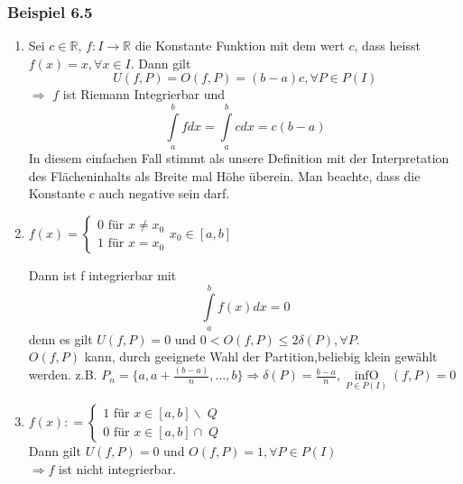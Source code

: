 \subsubsection*{Beispiel 6.5}
\begin{enumerate}[\indent 1)]
\item Sei $c\in \mathbb{R}$, $f:I\rightarrow \mathbb{R}$ die Konstante Funktion mit dem wert $c$, dass heisst $f(x)=x, \forall x\in I$. Dann gilt $$U(f,P)=O(f,P)=(b-a)c, \forall P\in P(I)$$ $\Rightarrow$ $f$ ist Riemann Integrierbar und $$\int\limits_a^b {fdx}  = \int\limits_a^b {cdx = c(b - a)} $$ In diesem einfachen Fall stimmt als unsere Definition mit der Interpretation des Flächeninhalts als Breite mal Höhe überein. Man beachte, dass die Konstante $c$ auch negative sein darf. 
\item $f(x) = \left\{ {\begin{array}{*{20}{c}}
{0{\text{ für }}x \ne {x_0}}\\
{1{\text{ für }}x = {x_0}}
\end{array}} \right.{x_0} \in [a,b]$

\begin{center}
\end{center}



Dann ist f integrierbar mit $$\int\limits_a^b {f(x)dx = 0}$$ denn es gilt $U(f,P)=0$ und $0<O(f,P) \leq 2\delta(P), \forall P$.\\

$O(f,P)$ kann, durch geeignete Wahl der Partition,beliebig klein gewählt werden. z.B. $P_n=\{a,a+\frac{{(b - a)}}{n},\dots,b\} \Rightarrow \delta (P)=\frac{b-a}{n}, \mathop {\inf O}\limits_{P \in P(I)} (f,P) = 0$

\item $f(x): = \left\{ {\begin{array}{*{20}{c}}
{1{\text{ für }}x \in [a,b]\backslash \;Q}\\
{0{\text{ für }}x \in [a,b] \cap \;Q}
\end{array}} \right.$
\\

Dann gilt $U(f,P)=0$ und $O(f,P)=1, \forall P\in P(I)$\\
$\Rightarrow f$ ist nicht integrierbar. 
\end{enumerate}

